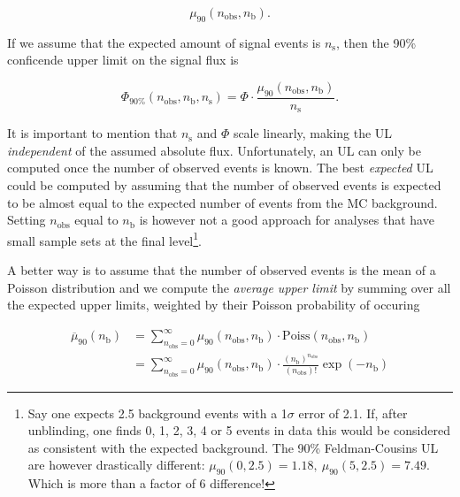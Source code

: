\begin{equation}
\mu_{90} \left(n_\textrm{obs},n_\textrm{b}\right).
\end{equation}

\noindent If we assume that the expected amount of signal events is $n_\textrm{s}$, then the 90\% conficende upper limit on the signal flux is

\begin{equation}
\label{eq:flux}
\Phi_{90\%}\left(n_\textrm{obs},n_\textrm{b},n_\textrm{s}\right) = \Phi \cdot  \frac{\mu_{90}\left(n_\textrm{obs},n_\textrm{b}\right)}{n_\textrm{s}}.
\end{equation}

\noindent It is important to mention that $n_\textrm{s}$ and $\Phi$ scale linearly, making the UL \textit{independent} of the assumed absolute flux. Unfortunately, an UL can only be computed once the number of observed events is known. The best \textit{expected} UL could be computed by assuming that the number of observed events is expected to be almost equal to the expected number of events from the MC background. Setting $n_\textrm{obs}$ equal to $n_\textrm{b}$ is however not a good approach for analyses that have small sample sets at the final level\footnote{Say one expects 2.5 background events with a 1$\sigma$ error of 2.1. If, after unblinding, one finds 0, 1, 2, 3, 4 or 5 events in data this would be considered as consistent with the expected background. The 90\% Feldman-Cousins UL are however drastically different: $\mu_{90}(0,2.5) = 1.18, \ \mu_{90}(5,2.5) = 7.49$. Which is more than a factor of 6 difference!}.

A better way is to assume that the number of observed events is the mean of a Poisson distribution and we compute the \textit{average upper limit} by summing over all the expected upper limits, weighted by their Poisson probability of occuring \cite{Hill:2002nv}

\begin{equation}
\begin{split}
\overline{\mu}_{90}(n_\textrm{b}) &= \sum^{\infty}_{n_\textrm{obs}=0} \mu_{90}\left(n_\textrm{obs},n_\textrm{b}\right) \cdot \textrm{Poiss}\left(n_\textrm{obs},n_\textrm{b}\right)\\
&= \sum^{\infty}_{n_\textrm{obs}=0} \mu_{90}\left(n_\textrm{obs},n_\textrm{b}\right) \cdot \frac{\left(n_\textrm{b}\right)^{n_\textrm{obs}}}{\left(n_\textrm{obs}\right)!} \exp\left(-n_\textrm{b}\right)
\end{split}
\end{equation}

